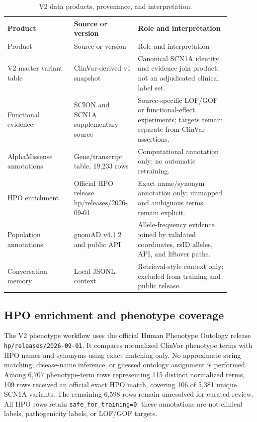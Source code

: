 \documentclass[12pt,a4paper]{article}
\newcommand{\code}[1]{\nolinkurl{#1}}
\begin{document}
\begin{longtable}{p{0.28\linewidth}p{0.22\linewidth}p{0.39\linewidth}}
\caption{V2 data products, provenance, and interpretation.}
\label{tab:v2sources}\\
\toprule
Product & Source or version & Role and interpretation\\
\midrule
\endfirsthead
\toprule
Product & Source or version & Role and interpretation\\
\midrule
\endhead
V2 master variant table & ClinVar-derived v1 snapshot & Canonical SCN1A identity and evidence join product; not an adjudicated clinical label set.\\
Functional evidence & SCION and SCN1A supplementary source & Source-specific LOF/GOF or functional-effect experiments; targets remain separate from ClinVar assertions.\\
AlphaMissense annotations & Gene/transcript table, 19,233 rows & Computational annotation only; no automatic retraining.\\
HPO enrichment & Official HPO release hp/releases/2026-09-01 & Exact name/synonym annotation only; unmapped and ambiguous terms remain explicit.\\
Population annotations & gnomAD v4.1.2 and public API & Allele-frequency evidence joined by validated coordinates, rsID alleles, API, and liftover paths.\\
Conversation memory & Local JSONL context & Retrieval-style context only; excluded from training and public release.\\
\bottomrule
\end{longtable}

\subsection{HPO enrichment and phenotype coverage}
The V2 phenotype workflow uses the official Human Phenotype Ontology release
\code{hp/releases/2026-09-01}. It compares normalized ClinVar phenotype terms
with HPO names and synonyms using exact matching only. No approximate string
matching, disease-name inference, or guessed ontology assignment is performed.
Among 6,707 phenotype-term rows representing 115 distinct normalized terms,
109 rows received an official exact HPO match, covering 106 of 5,381 unique
SCN1A variants. The remaining 6,598 rows remain unresolved for curated review.
All HPO rows retain \code{safe\_for\_training=0}: these annotations are not
clinical labels, pathogenicity labels, or LOF/GOF targets.
\end{document}
